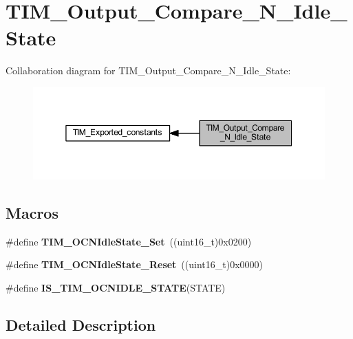 \hypertarget{group___t_i_m___output___compare___n___idle___state}{}\section{T\+I\+M\+\_\+\+Output\+\_\+\+Compare\+\_\+\+N\+\_\+\+Idle\+\_\+\+State}
\label{group___t_i_m___output___compare___n___idle___state}
Collaboration diagram for T\+I\+M\+\_\+\+Output\+\_\+\+Compare\+\_\+\+N\+\_\+\+Idle\+\_\+\+State\+:\nopagebreak
\begin{figure}[H]
\begin{center}
\leavevmode
\includegraphics[width=350pt]{group___t_i_m___output___compare___n___idle___state}
\end{center}
\end{figure}
\subsection*{Macros}
\begin{DoxyCompactItemize}
\item 
\mbox{\label{group___t_i_m___output___compare___n___idle___state_ga980392da6eb5bedcbf7ed353e1073f99}} 
\#define {\bfseries T\+I\+M\+\_\+\+O\+C\+N\+Idle\+State\+\_\+\+Set}~((uint16\+\_\+t)0x0200)
\item 
\mbox{\label{group___t_i_m___output___compare___n___idle___state_ga329a32820cdba0af9c4b7a04177e8fdd}} 
\#define {\bfseries T\+I\+M\+\_\+\+O\+C\+N\+Idle\+State\+\_\+\+Reset}~((uint16\+\_\+t)0x0000)
\item 
\#define {\bfseries I\+S\+\_\+\+T\+I\+M\+\_\+\+O\+C\+N\+I\+D\+L\+E\+\_\+\+S\+T\+A\+TE}(S\+T\+A\+TE)
\end{DoxyCompactItemize}


\subsection{Detailed Description}


